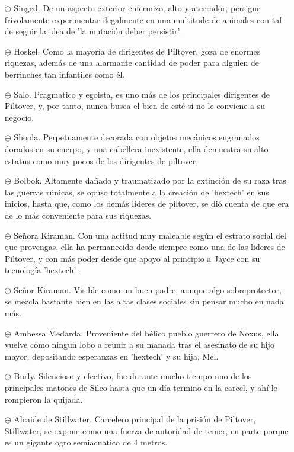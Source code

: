 \documentclass[11pt,A5]{article}
\begin{document}
\begin{itemize}
    \item[$\ominus$] Singed. De un aspecto exterior enfermizo, alto y aterrador, persigue frivolamente experimentar ilegalmente en una multitude de animales con tal de seguir la idea de 'la mutación deber persistir'.
    \item[$\ominus$] Hoskel. Como la mayoría de dirigentes de Piltover, goza de enormes riquezas, además de una alarmante cantidad de poder para alguien de berrinches tan infantiles como él. 
    \item[$\ominus$] Salo. Pragmatico y egoista, es uno más de los principales dirigentes de Piltover, y, por tanto, nunca busca el bien de esté si no le conviene a su negocio.
    \item[$\ominus$] Shoola. Perpetuamente decorada con objetos mecánicos engranados dorados en su cuerpo, y una cabellera inexistente, ella demuestra su alto estatus como muy pocos de los dirigentes de piltover.
    \item[$\ominus$] Bolbok. Altamente dañado y traumatizado por la extinción de su raza tras las guerras rúnicas, se opuso totalmente a la creación de 'hextech' en sus inicios, hasta que, como los demás lideres de piltover, se dió cuenta de que era de lo más conveniente para sus riquezas.
    \item[$\ominus$] Señora Kiraman. Con una actitud muy maleable según el estrato social del que provengas, ella ha permanecido desde siempre como una de las lideres de Piltover, y con más poder desde que apoyo al principio a Jayce con su tecnología 'hextech'.
    \item[$\ominus$] Señor Kiraman. Visible como un buen padre, aunque algo sobreprotector, se mezcla bastante bien en las altas clases sociales sin pensar mucho en nada más.
    \item[$\ominus$] Ambessa Medarda. Proveniente del bélico pueblo guerrero de Noxus, ella vuelve como ningun lobo a reunir a su manada tras el asesinato de su hijo mayor, depositando esperanzas en 'hextech' y su hija, Mel.
    \item[$\ominus$] Burly. Silencioso y efectivo, fue durante mucho tiempo uno de los principales matones de Silco hasta que un día termino en la carcel, y ahí le rompieron la quijada.
    \item[$\ominus$] Alcaide de Stillwater. Carcelero principal de la prisión de Piltover, Stillwater, se expone como una fuerza de autoridad de temer, en parte porque es un gigante ogro semiacuatico de 4 metros.

\end{itemize}
\end{document}
